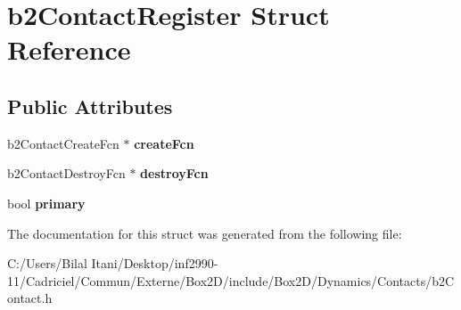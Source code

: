 \hypertarget{structb2_contact_register}{}\section{b2\+Contact\+Register Struct Reference}
\label{structb2_contact_register}
\subsection*{Public Attributes}
\begin{DoxyCompactItemize}
\item 
b2\+Contact\+Create\+Fcn $\ast$ {\bfseries create\+Fcn}\hypertarget{structb2_contact_register_ae065de11ab2f164bd1b8e3a461b41824}{}\label{structb2_contact_register_ae065de11ab2f164bd1b8e3a461b41824}

\item 
b2\+Contact\+Destroy\+Fcn $\ast$ {\bfseries destroy\+Fcn}\hypertarget{structb2_contact_register_a95862aec746f5fd6ffa00a6729dec61f}{}\label{structb2_contact_register_a95862aec746f5fd6ffa00a6729dec61f}

\item 
bool {\bfseries primary}\hypertarget{structb2_contact_register_a43f2d79909505b785b9034b21a56525e}{}\label{structb2_contact_register_a43f2d79909505b785b9034b21a56525e}

\end{DoxyCompactItemize}


The documentation for this struct was generated from the following file\+:\begin{DoxyCompactItemize}
\item 
C\+:/\+Users/\+Bilal Itani/\+Desktop/inf2990-\/11/\+Cadriciel/\+Commun/\+Externe/\+Box2\+D/include/\+Box2\+D/\+Dynamics/\+Contacts/b2\+Contact.\+h\end{DoxyCompactItemize}
